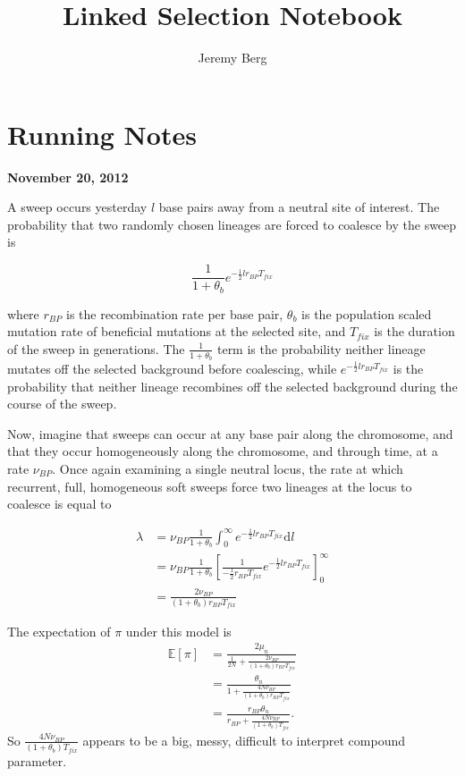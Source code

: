 \documentclass[reqno]{amsart}
\begin{document}
\title{Linked Selection Notebook}
\author{Jeremy Berg}
\date{}
\maketitle



\section*{Running Notes}

\begin{flushright}
	\textbf{November 20, 2012}
\end{flushright}

A sweep occurs yesterday $l$ base pairs away from a neutral site of interest. The probability that two randomly chosen lineages are forced to coalesce by the sweep is


$$\frac{1}{1 + \theta_b}e^{-\frac{1}{2}lr_{BP}T_{fix}}$$

where $r_{BP}$ is the recombination rate per base pair, $\theta_b$ is the population scaled mutation rate of beneficial mutations at the selected site, and $T_{fix}$ is the duration of the sweep in generations\cite{Pennings2006}. The $\frac{1}{1 + \theta_b}$ term is the probability neither lineage mutates off the selected background before coalescing, while $e^{-\frac{1}{2}lr_{BP}T_{fix}}$ is the probability that neither lineage recombines off the selected background during the course of the sweep.

Now, imagine that sweeps can occur at any base pair along the chromosome, and that they occur homogeneously along the chromosome, and through time, at a rate $\nu_{BP}$. Once again examining a single neutral locus, the rate at which recurrent, full, homogeneous soft sweeps force two lineages at the locus to coalesce is equal to


\begin{align}
	\lambda &= \nu_{BP}\frac{1}{1+\theta_b}\int_0^\infty e^{-\frac{1}{2}lr_{BP}T_{fix}}\mathrm d l\\
	& = \nu_{BP}\frac{1}{1+\theta_b}\left[\frac{1}{-\frac{1}{2}r_{BP}T_{fix}}e^{-\frac{1}{2}lr_{BP}T_{fix}}\right]_0^\infty \\
	&= \frac{2\nu_{BP}}{\left(1+\theta_b\right)r_{BP}T_{fix}}
\end{align}

The expectation of $\pi$ under this model is
\begin{align}
	\mathbb{E}\left[\pi\right] &= \frac{2\mu_n}{\frac{1}{2N} +  \frac{2\nu_{BP}}{\left(1+\theta_b\right)r_{BP}T_{fix}}} \\
	&= \frac{\theta_n}{1 + \frac{4N\nu_{BP}}{\left(1+\theta_b\right)r_{BP}T_{fix}}} \\
	& = \frac{r_{BP}\theta_n}{r_{BP} + \frac{4N\nu_{BP}}{\left(1+\theta_b\right)T_{fix}}}.
\end{align}
So $\frac{4N\nu_{BP}}{\left(1+\theta_b\right)T_{fix}}$ appears to be a big, messy, difficult to interpret compound parameter.
\end{document}
